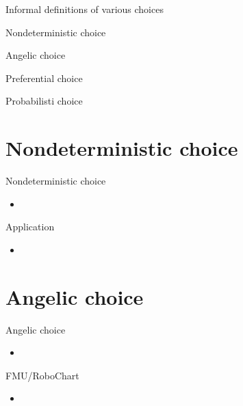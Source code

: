 \documentclass[%
slidestop,%
compress,%
mathserif,%
table,%
usenames,%
aspectratio=169,
dvipsnames,%
]{beamer}%
\begin{document}
\begin{frame}{Informal definitions of various choices}
    \begin{block}{Nondeterministic choice}
    \end{block}
    \begin{block}{Angelic choice}
    \end{block}
    \begin{block}{Preferential choice}
    \end{block}
    \begin{block}{Probabilisti choice}
    \end{block}
\end{frame}

\section{Nondeterministic choice}
\begin{frame}{Nondeterministic choice}
    \begin{itemize}
        \item 
    \end{itemize}
\end{frame}

\begin{frame}{Application}
    \begin{itemize}
        \item 
    \end{itemize}
\end{frame}

\section{Angelic choice}
\begin{frame}{Angelic choice}
    \begin{itemize}
        \item 
    \end{itemize}
\end{frame}

\begin{frame}{FMU/RoboChart}
    \begin{itemize}
        \item 
    \end{itemize}
\end{frame}
\end{document}
